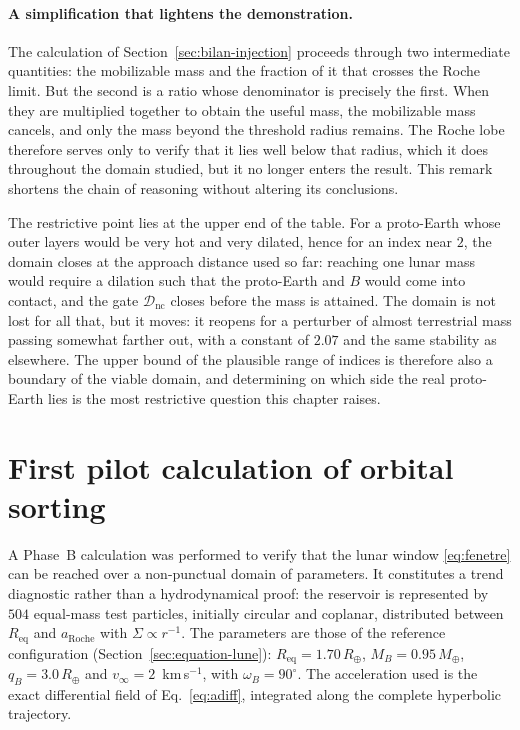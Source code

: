 \documentclass[11pt,a4paper,openany]{report}
\newcommand{\Mt}{M_{\oplus}}
\newcommand{\Rt}{R_{\oplus}}
\newcommand{\Req}{R_{\mathrm{eq}}}
\newcommand{\aR}{a_{\mathrm{Roche}}}
\begin{document}
\paragraph{A simplification that lightens the demonstration.} The calculation of
Section~\ref{sec:bilan-injection} proceeds through two intermediate quantities: the mobilizable
mass and the fraction of it that crosses the Roche limit. But the second is a ratio whose
denominator is precisely the first. When they are multiplied together to obtain the useful mass,
the mobilizable mass cancels, and only the mass beyond the threshold radius remains. The Roche lobe
therefore serves only to verify that it lies well below that radius, which it does throughout the
domain studied, but it no longer enters the result. This remark shortens the chain of reasoning
without altering its conclusions.

\begin{controle}
The restrictive point lies at the upper end of the table. For a proto-Earth whose outer layers
would be very hot and very dilated, hence for an index near $2$, the domain closes at the approach
distance used so far: reaching one lunar mass would require a dilation such that the proto-Earth
and $B$ would come into contact, and the gate $\mathcal{D}_{\mathrm{nc}}$ closes before the mass is
attained. The domain is not lost for all that, but it moves: it reopens for a perturber of almost
terrestrial mass passing somewhat farther out, with a constant of $2.07$ and the same stability as
elsewhere. The upper bound of the plausible range of indices is therefore also a boundary of the
viable domain, and determining on which side the real proto-Earth lies is the most restrictive
question this chapter raises.
\end{controle}

\section{First pilot calculation of orbital sorting}
\label{sec:pilot-etaL}

A Phase~B calculation was performed to verify that the lunar window \eqref{eq:fenetre} can be
reached over a non-punctual domain of parameters. It constitutes a trend diagnostic rather than a
hydrodynamical proof: the reservoir is represented by $504$ equal-mass test particles, initially
circular and coplanar, distributed between $\Req$ and $\aR$ with $\Sigma\propto r^{-1}$. The
parameters are those of the reference configuration (Section~\ref{sec:equation-lune}):
$\Req=1.70\,\Rt$, $M_B=0.95\,\Mt$, $q_B=3.0\,\Rt$ and $v_\infty=2$~km\,s$^{-1}$, with
$\omega_B=90^\circ$. The acceleration used is the exact differential field of
Eq.~\eqref{eq:adiff}, integrated along the complete hyperbolic trajectory.
\end{document}
